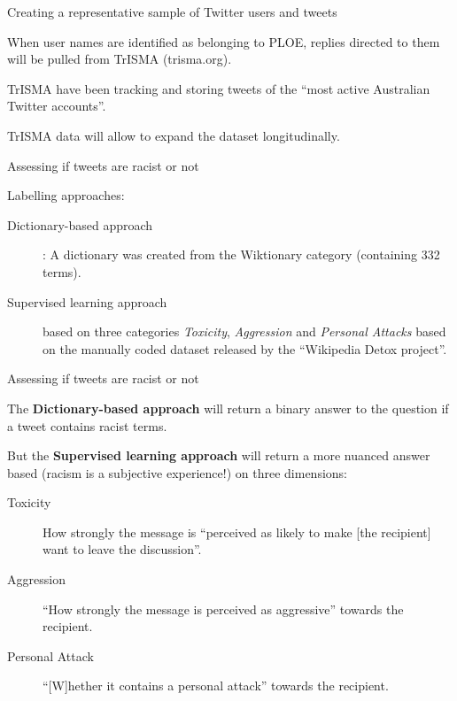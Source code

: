 \documentclass[serif, aspectratio=169]{beamer}
\begin{document}
\begin{frame}
{Creating a representative sample of Twitter users and tweets}

When user names are identified as belonging to PLOE, replies directed to them will be pulled from TrISMA (trisma.org).

TrISMA have been tracking and storing tweets of the \enquote{most active Australian Twitter accounts}.

TrISMA data will allow to expand the dataset longitudinally. 

\end{frame}

\begin{frame}
{Assessing if tweets are racist or not}

Labelling approaches:

\begin{description}

\item[Dictionary-based approach]: A dictionary was created from the Wiktionary category  (containing 332 terms).

\item[Supervised learning approach] based on three categories \textit{Toxicity}, \textit{Aggression} and \textit{Personal Attacks} based on the manually coded dataset released by the \enquote{Wikipedia Detox project}.

\end{description}


\end{frame}

\begin{frame}
{Assessing if tweets are racist or not}

The \textbf{Dictionary-based approach} will return a binary answer to the question if a tweet contains racist terms. 

But the \textbf{Supervised learning approach} will return a more nuanced answer based (racism is a subjective experience!) on three dimensions: 

\begin{description}

\item[Toxicity] How strongly the message is \enquote{perceived as likely to make [the recipient] want to leave the discussion}.

\item[Aggression] \enquote{How strongly the message is perceived as aggressive} towards the recipient.

\item[Personal Attack] \enquote{[W]hether it contains a personal attack} towards the recipient.

\end{description}

\end{frame}


\begin{frame}[allowframebreaks]
\printbibliography
\end{frame}
\end{document}
